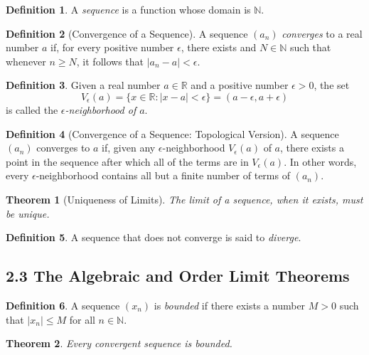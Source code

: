 \documentclass{amsart}
\newtheorem*{theorem}{Theorem}
\theoremstyle{definition}
\newtheorem*{definition}{Definition}
\newcommand{\N}{\mathbb{N}}
\newcommand{\R}{\mathbb{R}}
\newcommand{\abs}[1]{|#1|}
\newcommand{\st}{\mathrel{:}}
\begin{document}
\begin{definition}
  A \emph{sequence} is a function whose domain is $\N$.
\end{definition}

\begin{definition}[Convergence of a Sequence]
  A sequence $(a_n)$ \emph{converges} to a real number $a$ if, for every
  positive number $\epsilon$, there exists and $N \in \N$ such that whenever $n
  \ge N$, it follows that $\abs{a_n - a} < \epsilon$.
\end{definition}

\begin{definition}
  Given a real number $a \in \R$ and a positive number $\epsilon > 0$, the set
  \[
    V_\epsilon(a) = \{x \in \R \st \abs{x - a} < \epsilon\} = (a - \epsilon, a +
    \epsilon)
  \]
  is called the \emph{$\epsilon$-neighborhood of $a$}.
\end{definition}

\begin{definition}[Convergence of a Sequence: Topological Version]
  A sequence $(a_n)$ converges to $a$ if, given any $\epsilon$-neighborhood
  $V_\epsilon(a)$ of $a$, there exists a point in the sequence after which all
  of the terms are in $V_\epsilon(a)$. In other words, every
  $\epsilon$-neighborhood contains all but a finite number of terms of $(a_n)$.
\end{definition}

\begin{theorem}[Uniqueness of Limits]
  The limit of a sequence, when it exists, must be unique.
\end{theorem}

\begin{definition}
  A sequence that does not converge is said to \emph{diverge}.
\end{definition}

\subsection*{2.3 The Algebraic and Order Limit Theorems}

\begin{definition}
  A sequence $(x_n)$ is \emph{bounded} if there exists a number $M > 0$ such
  that $\abs{x_n} \le M$ for all $n \in \N$.
\end{definition}

\begin{theorem}
  Every convergent sequence is bounded.
\end{theorem}
\end{document}
